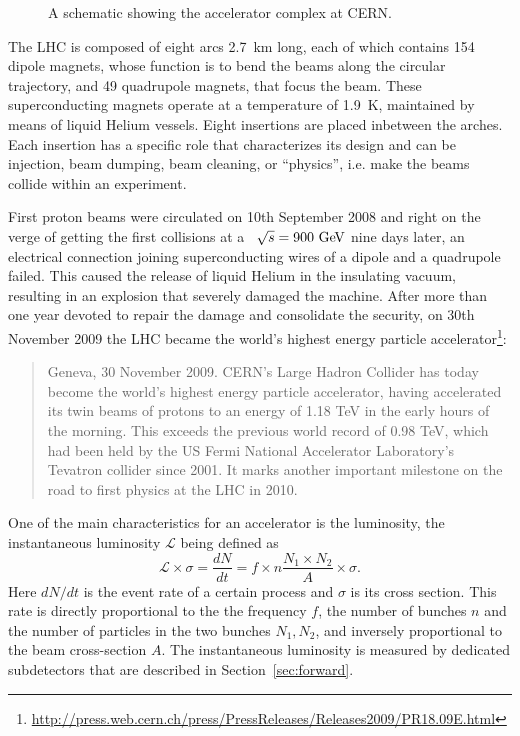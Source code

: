 \begin{figure}[tb]\begin{center}
	\caption{A schematic showing the accelerator complex at CERN.\label{fig:lhcring}}
\end{center}\end{figure}



The LHC is composed of eight arcs 2.7~km long, each of which contains 154 dipole 
magnets, whose function is to  bend the beams along the circular trajectory, and
49 quadrupole magnets, that focus the beam. These superconducting magnets operate
at a temperature of 1.9~K, maintained by means of liquid Helium vessels.
Eight insertions are placed inbetween the arches. Each insertion has a specific
role that characterizes its design and can be injection, beam dumping, beam cleaning,
or ``physics'', i.e. make the beams collide within an experiment.

First proton beams were circulated on 10th September 2008 and right on the verge of
getting the first collisions at a \cme\ $\rts=900\gev$ nine days later, an electrical
connection joining superconducting wires of a dipole and a quadrupole
failed. This caused the release of liquid Helium in the insulating vacuum,
resulting in an explosion that severely damaged the machine.
After more than one year devoted to repair the damage and consolidate the security,
on 30th November 2009 the LHC became the world's highest energy particle 
accelerator\footnote{\url{http://press.web.cern.ch/press/PressReleases/Releases2009/PR18.09E.html}}:
\begin{quotation}\small
Geneva, 30 November 2009. CERN's Large Hadron Collider has today become the world’s highest energy particle accelerator, having accelerated its twin beams of protons to an energy of 1.18 TeV in the early hours of the morning. This exceeds the previous world record of 0.98 TeV, which had been held by the US Fermi National Accelerator Laboratory’s Tevatron collider since 2001. It marks another important milestone on the road to first physics at the LHC in 2010.
\end{quotation}


One of the main characteristics for an accelerator is the luminosity, the 
instantaneous luminosity $\mathcal L$ being defined as 
\begin{equation}\label{eq:lumiN}
\mathcal{L}\times\sigma=\dfrac{dN}{dt}=f\times n\dfrac{N_1\times N_2}{A}\times\sigma.
\end{equation} 
Here $dN/dt $ is the event rate of a certain process and $\sigma$ is its cross 
section. This rate is directly proportional to the the frequency $f$, the number 
of bunches $n$ and the number of particles in the two bunches $N_1, N_2$, and
inversely proportional to the beam cross-section $A$.
The instantaneous luminosity is measured by dedicated subdetectors that are
described in Section~\ref{sec:forward}.

